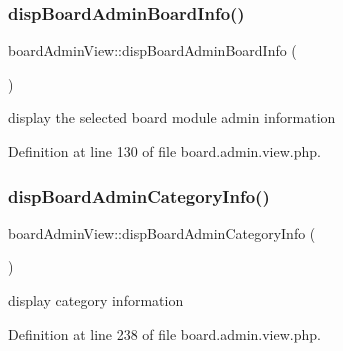 \hypertarget{classboardAdminView_a3712817f1117103b470796946abc62a4}{}\label{classboardAdminView_a3712817f1117103b470796946abc62a4} 
\subsubsection{\texorpdfstring{disp\+Board\+Admin\+Board\+Info()}{dispBoardAdminBoardInfo()}}
{\footnotesize\ttfamily board\+Admin\+View\+::disp\+Board\+Admin\+Board\+Info (\begin{DoxyParamCaption}{ }\end{DoxyParamCaption})}



display the selected board module admin information 



Definition at line 130 of file board.\+admin.\+view.\+php.

\hypertarget{classboardAdminView_a53544e00aae20f5b0dfa86f15cc1895b}{}\label{classboardAdminView_a53544e00aae20f5b0dfa86f15cc1895b} 
\subsubsection{\texorpdfstring{disp\+Board\+Admin\+Category\+Info()}{dispBoardAdminCategoryInfo()}}
{\footnotesize\ttfamily board\+Admin\+View\+::disp\+Board\+Admin\+Category\+Info (\begin{DoxyParamCaption}{ }\end{DoxyParamCaption})}



display category information 



Definition at line 238 of file board.\+admin.\+view.\+php.

\hypertarget{classboardAdminView_a9e8c74683b01595dc6dafa5f2f41dd53}{}\label{classboardAdminView_a9e8c74683b01595dc6dafa5f2f41dd53} 
